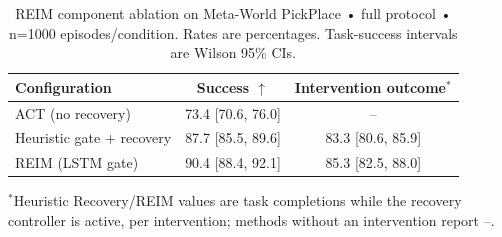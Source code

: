 \begin{table}[t]
\centering
\small
\caption{REIM component ablation on Meta-World PickPlace • full protocol • n=1000 episodes/condition. Rates are percentages. Task-success intervals are Wilson 95\% CIs.}
\label{tab:ablation}
\begin{tabular}{lcc}
\toprule
Configuration & Success $\uparrow$ & Intervention outcome$^\ast$ \\
\midrule
ACT (no recovery) & 73.4 [70.6, 76.0] & -- \\
Heuristic gate + recovery & 87.7 [85.5, 89.6] & 83.3 [80.6, 85.9] \\
REIM (LSTM gate) & 90.4 [88.4, 92.1] & 85.3 [82.5, 88.0] \\
\bottomrule
\end{tabular}
\vspace{1mm}\parbox{0.98\linewidth}{\footnotesize $^\ast$Heuristic Recovery/REIM values are task completions while the recovery controller is active, per intervention; methods without an intervention report --.}
\end{table}
